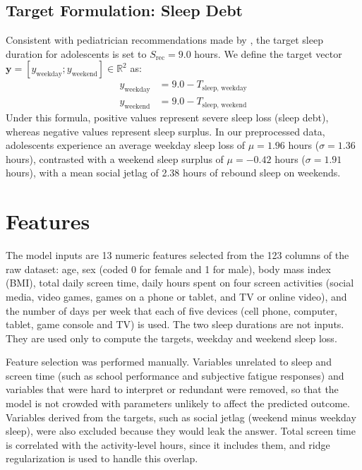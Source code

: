 \documentclass[11pt]{article}
\begin{document}
\subsection{Target Formulation: Sleep Debt}
Consistent with pediatrician recommendations made by \citet{paruthi2016recommended}, the target sleep duration for adolescents is set to $S_{\text{rec}} = 9.0$ hours. We define the target vector $\mathbf{y} = [y_{\text{weekday}}; y_{\text{weekend}}] \in \mathbb{R}^2$ as:
\begin{align}
    y_{\text{weekday}} &= 9.0 - T_{\text{sleep, weekday}} \\
    y_{\text{weekend}} &= 9.0 - T_{\text{sleep, weekend}}
\end{align}
Under this formula, positive values represent severe sleep loss (sleep debt), whereas negative values represent sleep surplus. In our preprocessed data, adolescents experience an average weekday sleep loss of $\mu = 1.96$ hours ($\sigma = 1.36$ hours), contrasted with a weekend sleep surplus of $\mu = -0.42$ hours ($\sigma = 1.91$ hours), with a mean social jetlag of 2.38 hours of rebound sleep on weekends.

\section{Features}

The model inputs are 13 numeric features selected from the 123 columns of the raw dataset: age, sex (coded 0 for female and 1 for male), body mass index (BMI), total daily screen time, daily hours spent on four screen activities (social media, video games, games on a phone or tablet, and TV or online video), and the number of days per week that each of five devices (cell phone, computer, tablet, game console and TV) is used. The two sleep durations are not inputs. They are used only to compute the targets, weekday and weekend sleep loss.

Feature selection was performed manually. Variables unrelated to sleep and screen time (such as school performance and subjective fatigue responses) and variables that were hard to interpret or redundant were removed, so that the model is not crowded with parameters unlikely to affect the predicted outcome. Variables derived from the targets, such as social jetlag (weekend minus weekday sleep), were also excluded because they would leak the answer. Total screen time is correlated with the activity-level hours, since it includes them, and ridge regularization is used to handle this overlap.
\end{document}
